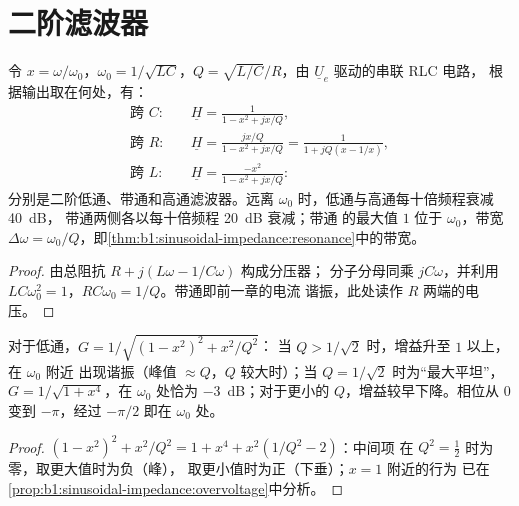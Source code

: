 \section{二阶滤波器}

\begin{proposition}\label{prop:b1:filters-transfer-functions:rlc}
令 $x = \omega/\omega_0$，$\omega_0 = 1/\sqrt{LC}$，$Q =
\sqrt{L/C}/R$，由 $\underline U_e$ 驱动的串联 RLC 电路，
根据输出取在何处，有：
\begin{align*}
\text{跨 } C:&\quad \underline H = \frac{1}{1 - x^2 + jx/Q}, \\
\text{跨 } R:&\quad \underline H = \frac{jx/Q}{1 - x^2 + jx/Q} = \frac{1}{1 + jQ(x - 1/x)}, \\
\text{跨 } L:&\quad \underline H = \frac{-x^2}{1 - x^2 + jx/Q}:
\end{align*}
分别是二阶低通、带通和高通滤波器。远离
$\omega_0$ 时，低通与高通每十倍频程衰减 \qty{40}{dB}，
带通两侧各以每十倍频程 \qty{20}{dB} 衰减；带通
的最大值 $1$ 位于 $\omega_0$，带宽 $\Delta\omega =
\omega_0/Q$，即\cref{thm:b1:sinusoidal-impedance:resonance}中的带宽。
\end{proposition}

\begin{proof}
由总阻抗 $R + j(L\omega - 1/C\omega)$ 构成分压器；
分子分母同乘 $jC\omega$，并利用
$LC\omega_0^2 = 1$，$RC\omega_0 = 1/Q$。带通即前一章的电流
谐振，此处读作 $R$ 两端的电压。
\end{proof}

\begin{proposition}\label{prop:b1:filters-transfer-functions:lowpass2}
对于低通，$G = 1/\sqrt{(1 - x^2)^2 + x^2/Q^2}$：
当 $Q > 1/\sqrt2$ 时，增益升至 $1$ 以上，在 $\omega_0$ 附近
出现谐振（峰值 $\approx Q$，$Q$ 较大时）；当 $Q = 1/\sqrt2$ 时为“最大平坦”，
$G = 1/\sqrt{1 + x^4}$，在 $\omega_0$ 处恰为 \qty{-3}{dB}；对于更小的
$Q$，增益较早下降。相位从 $0$ 变到 $-\pi$，经过 $-\pi/2$
即在 $\omega_0$ 处。
\end{proposition}

\begin{proof}
$(1 - x^2)^2 + x^2/Q^2 = 1 + x^4 + x^2(1/Q^2 - 2)$：中间项
在 $Q^2 = \tfrac12$ 时为零，取更大值时为负（峰），
取更小值时为正（下垂）；$x = 1$ 附近的行为
已在\cref{prop:b1:sinusoidal-impedance:overvoltage}中分析。
\end{proof}

